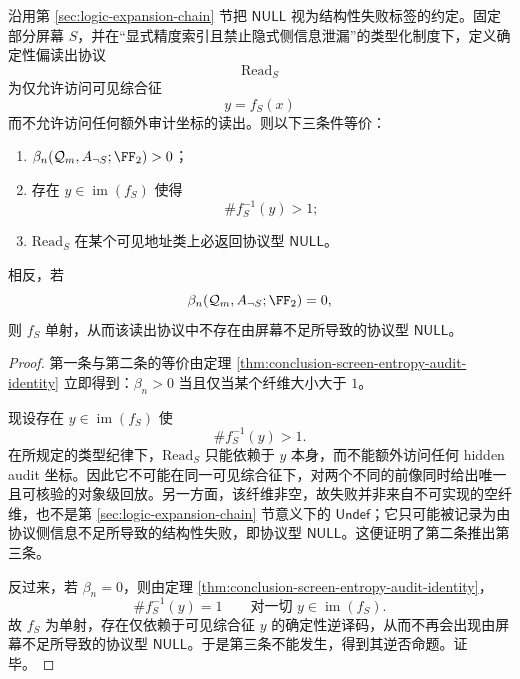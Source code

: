 \begin{theorem}\label{thm:conclusion-relative-homology-corank-protocol-null}
沿用第 \ref{sec:logic-expansion-chain} 节把 \(\mathsf{NULL}\) 视为结构性失败标签的约定。固定部分屏幕 \(S\)，并在“显式精度索引且禁止隐式侧信息泄漏”的类型化制度下，定义确定性偏读出协议
\[
\mathrm{Read}_S
\]
为仅允许访问可见综合征
\[
y=f_S(x)
\]
而不允许访问任何额外审计坐标的读出。则以下三条件等价：
\begin{enumerate}
  \item \(\beta_n(\mathcal Q_m,A_{\neg S};\FF_2)>0\)；
  \item 存在 \(y\in \operatorname{im}(f_S)\) 使得
        \[
        \#f_S^{-1}(y)>1;
        \]
  \item \(\mathrm{Read}_S\) 在某个可见地址类上必返回协议型 \(\mathsf{NULL}\)。
\end{enumerate}
相反，若
\[
\beta_n(\mathcal Q_m,A_{\neg S};\FF_2)=0,
\]
则 \(f_S\) 单射，从而该读出协议中不存在由屏幕不足所导致的协议型 \(\mathsf{NULL}\)。
\end{theorem}

\begin{proof}
第一条与第二条的等价由定理 \ref{thm:conclusion-screen-entropy-audit-identity} 立即得到：\(\beta_n>0\) 当且仅当某个纤维大小大于 \(1\)。

现设存在 \(y\in \operatorname{im}(f_S)\) 使
\[
\#f_S^{-1}(y)>1.
\]
在所规定的类型纪律下，\(\mathrm{Read}_S\) 只能依赖于 \(y\) 本身，而不能额外访问任何 hidden audit 坐标。因此它不可能在同一可见综合征下，对两个不同的前像同时给出唯一且可核验的对象级回放。另一方面，该纤维非空，故失败并非来自不可实现的空纤维，也不是第 \ref{sec:logic-expansion-chain} 节意义下的 \(\mathsf{Undef}\)；它只可能被记录为由协议侧信息不足所导致的结构性失败，即协议型 \(\mathsf{NULL}\)。这便证明了第二条推出第三条。

反过来，若 \(\beta_n=0\)，则由定理 \ref{thm:conclusion-screen-entropy-audit-identity}，
\[
\#f_S^{-1}(y)=1
\qquad
\text{对一切 }y\in \operatorname{im}(f_S).
\]
故 \(f_S\) 为单射，存在仅依赖于可见综合征 \(y\) 的确定性逆译码，从而不再会出现由屏幕不足所导致的协议型 \(\mathsf{NULL}\)。于是第三条不能发生，得到其逆否命题。证毕。
\end{proof}

